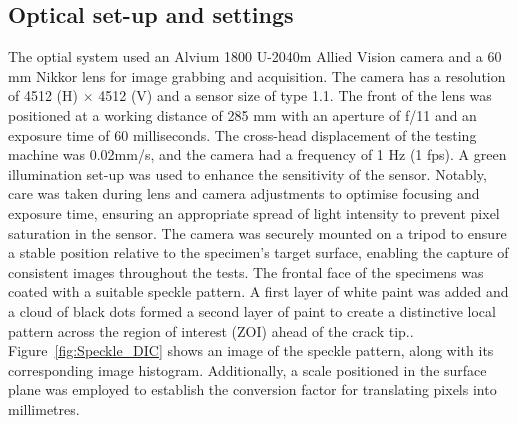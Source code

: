 \documentclass[3p,times,procedia]{elsarticle}
\begin{document}
\subsection{Optical set-up and settings}\label{Ss:optical}

The optial system used an Alvium 1800 U-2040m Allied Vision camera and a 60 mm Nikkor lens for image grabbing and acquisition. The camera has a resolution of 4512 (H) $\times$ 4512 (V) and a sensor size of type 1.1. The front of the lens was positioned at a working distance of 285 mm with an aperture of f/11 and an exposure time of 60 milliseconds. The cross-head displacement of the testing machine was 0.02mm/s, and the camera had a frequency of 1 Hz (1 fps).
A green illumination set-up was used to enhance the sensitivity of the sensor. Notably, care was taken during lens and camera adjustments to optimise focusing and exposure time, ensuring an appropriate spread of light intensity to prevent pixel saturation in the sensor. The camera was securely mounted on a tripod to ensure a stable position relative to the specimen's target surface, enabling the capture of consistent images throughout the tests. The frontal face of the specimens was coated with a suitable speckle pattern. A first layer of white paint was added and a cloud of black dots formed a second layer of paint to create a distinctive local pattern across the region of interest (ZOI) ahead of the crack tip.. Figure~\ref{fig:Speckle_DIC} shows an image of the speckle pattern, along with its corresponding image histogram. Additionally, a scale positioned in the surface plane was employed to establish the conversion factor for translating pixels into millimetres.
\end{document}
